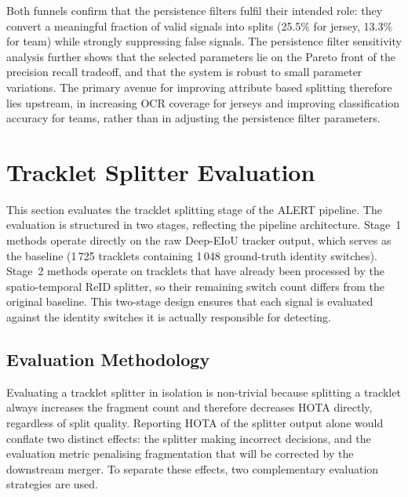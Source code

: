 Both funnels confirm that the persistence filters fulfil their intended role: they convert a meaningful fraction of valid signals into splits (25.5\% for jersey, 13.3\% for team) while strongly suppressing false signals. The persistence filter sensitivity analysis further shows that the selected parameters lie on the Pareto front of the precision recall tradeoff, and that the system is robust to small parameter variations. The primary avenue for improving attribute based splitting therefore lies upstream, in increasing OCR coverage for jerseys and improving classification accuracy for teams, rather than in adjusting the persistence filter parameters.


\section{Tracklet Splitter Evaluation}\label{sec:splitter_eval}

This section evaluates the tracklet splitting stage of the ALERT pipeline. The evaluation is structured in two stages, reflecting the pipeline architecture. Stage~1 methods operate directly on the raw Deep-EIoU tracker output, which serves as the baseline (1\,725 tracklets containing 1\,048 ground-truth identity switches). Stage~2 methods operate on tracklets that have already been processed by the spatio-temporal ReID splitter, so their remaining switch count differs from the original baseline. This two-stage design ensures that each signal is evaluated against the identity switches it is actually responsible for detecting.

\subsection{Evaluation Methodology}\label{subsec:splitter_methodology}

Evaluating a tracklet splitter in isolation is non-trivial because splitting a tracklet always increases the fragment count and therefore decreases HOTA directly, regardless of split quality. Reporting HOTA of the splitter output alone would conflate two distinct effects: the splitter making incorrect decisions, and the evaluation metric penalising fragmentation that will be corrected by the downstream merger. To separate these effects, two complementary evaluation strategies are used.

